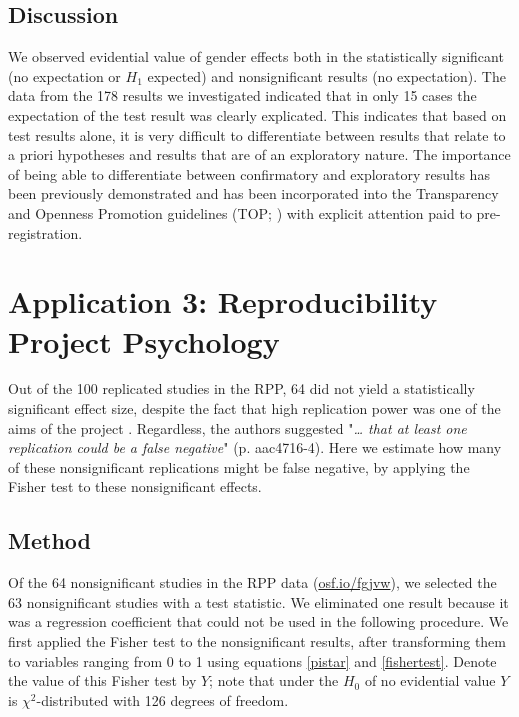 \documentclass{article}
\begin{document}
\subsection*{Discussion}

We observed evidential value of gender effects both in the statistically significant (no expectation or $H_1$ expected) and nonsignificant results (no expectation). The data from the 178 results we investigated indicated that in only 15 cases the expectation of the test result was clearly explicated. This indicates that based on test results alone, it is very difficult to differentiate between results that relate to a priori hypotheses and results that are of an exploratory nature. The importance of being able to differentiate between confirmatory and exploratory results has been previously demonstrated \cite{Wagenmakers2012-jq} and has been incorporated into the Transparency and Openness Promotion guidelines (TOP; \cite{Nosek2015-nr}) with explicit attention paid to pre-registration.

\section*{Application 3: Reproducibility Project Psychology}

Out of the 100 replicated studies in the RPP, 64 did not yield a statistically significant effect size, despite the fact that high replication power was one of the aims of the project \cite{Open_Science_Collaboration2015-zs}. Regardless, the authors suggested "\textit{… that at least one replication could be a false negative}" (p. aac4716-4). Here we estimate how many of these nonsignificant replications might be false negative, by applying the Fisher test to these nonsignificant effects.

\subsection*{Method}

Of the 64 nonsignificant studies in the RPP data (\url{osf.io/fgjvw}), we selected the 63 nonsignificant studies with a test statistic. We eliminated one result because it was a regression coefficient that could not be used in the following procedure. We first applied the Fisher test to the nonsignificant results, after transforming them to variables ranging from 0 to 1 using equations \ref{pistar} and \ref{fishertest}. Denote the value of this Fisher test by $Y$; note that under the $H_0$ of no evidential value $Y$ is $\chi^2$-distributed with 126 degrees of freedom.
\end{document}
